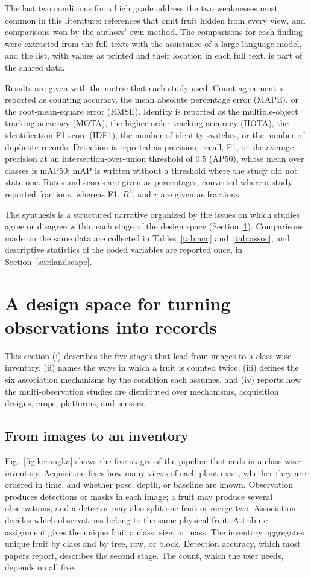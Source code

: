The last two conditions for a high grade address the two weaknesses most common in this literature: references that omit fruit hidden from every view, and comparisons won by the authors' own method. The comparisons for each finding were extracted from the full texts with the assistance of a large language model, and the list, with values as printed and their location in each full text, is part of the shared data.

Results are given with the metric that each study used. Count agreement is reported as counting accuracy, the mean absolute percentage error (MAPE), or the root-mean-square error (RMSE). Identity is reported as the multiple-object tracking accuracy (MOTA), the higher-order tracking accuracy (HOTA), the identification F1 score (IDF1), the number of identity switches, or the number of duplicate records. Detection is reported as precision, recall, F1, or the average precision at an intersection-over-union threshold of 0.5 (AP50), whose mean over classes is mAP50; mAP is written without a threshold where the study did not state one. Rates and scores are given as percentages, converted where a study reported fractions, whereas F1, $R^2$, and $r$ are given as fractions.

The synthesis is a structured narrative organized by the issues on which studies agree or disagree within each stage of the design space (Section~\ref{sec:framework}). Comparisons made on the same data are collected in Tables~\ref{tab:acq} and~\ref{tab:assoc}, and descriptive statistics of the coded variables are reported once, in Section~\ref{sec:landscape}.

\section{A design space for turning observations into records}\label{sec:framework}

This section (i) describes the five stages that lead from images to a class-wise inventory, (ii) names the ways in which a fruit is counted twice, (iii) defines the six association mechanisms by the condition each assumes, and (iv) reports how the \nMulti multi-observation studies are distributed over mechanisms, acquisition designs, crops, platforms, and sensors.

\subsection{From images to an inventory}
Fig.~\ref{fig:kerangka} shows the five stages of the pipeline that ends in a class-wise inventory. Acquisition fixes how many views of each plant exist, whether they are ordered in time, and whether pose, depth, or baseline are known. Observation produces detections or masks in each image; a fruit may produce several observations, and a detector may also split one fruit or merge two. Association decides which observations belong to the same physical fruit. Attribute assignment gives the unique fruit a class, size, or mass. The inventory aggregates unique fruit by class and by tree, row, or block. Detection accuracy, which most papers report, describes the second stage. The count, which the user needs, depends on all five.

